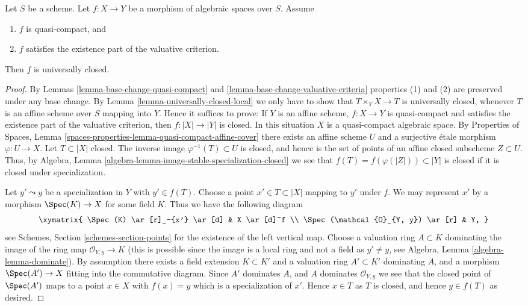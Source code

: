 \begin{lemma}
\label{lemma-quasi-compact-existence-universally-closed}
Let $S$ be a scheme.
Let $f : X \to Y$ be a morphism of algebraic spaces over $S$.
Assume
\begin{enumerate}
\item $f$ is quasi-compact, and
\item $f$ satisfies the existence part of the valuative criterion.
\end{enumerate}
Then $f$ is universally closed.
\end{lemma}

\begin{proof}
By Lemmas \ref{lemma-base-change-quasi-compact}
and \ref{lemma-base-change-valuative-criteria}
properties (1) and (2) are preserved under
any base change. By Lemma \ref{lemma-universally-closed-local}
we only have to show that $T \times_Y X \to T$ is universally closed,
whenever $T$ is an affine scheme over $S$ mapping into $Y$. Hence it
suffices to prove: If $Y$ is an affine scheme, $f : X \to Y$ is quasi-compact
and satisfies the existence part of the valuative criterion, then
$f : |X| \to |Y|$ is closed. In this situation $X$ is a quasi-compact
algebraic space. By
Properties of Spaces,
Lemma \ref{spaces-properties-lemma-quasi-compact-affine-cover}
there exists an affine scheme $U$ and a surjective \'etale morphism
$\varphi : U \to X$. Let $T \subset |X|$ closed. The inverse image
$\varphi^{-1}(T) \subset U$ is closed, and hence is the set of points
of an affine closed subscheme $Z \subset U$. Thus, by
Algebra, Lemma \ref{algebra-lemma-image-stable-specialization-closed}
we see that $f(T) = f(\varphi(|Z|)) \subset |Y|$ is closed if it is
closed under specialization.

\medskip\noindent
Let $y' \leadsto y$ be a specialization in $Y$ with $y' \in f(T)$.
Choose a point $x' \in T \subset |X|$ mapping to $y'$ under $f$.
We may represent $x'$ by a morphism $\Spec(K) \to X$
for some field $K$. Thus we have the following diagram
$$
\xymatrix{
\Spec(K) \ar[r]_-{x'} \ar[d] & X \ar[d]^f \\
\Spec(\mathcal{O}_{Y, y}) \ar[r] & Y,
}
$$
see
Schemes, Section \ref{schemes-section-points}
for the existence of the left vertical map.
Choose a valuation ring $A \subset K$ dominating the image of
the ring map $\mathcal{O}_{Y, y} \to K$ (this is possible since
the image is a local ring and not a field as $y' \not = y$, see
Algebra, Lemma \ref{algebra-lemma-dominate}).
By assumption there exists a field extension $K \subset K'$ and a
valuation ring $A' \subset K'$ dominating $A$, and a morphism
$\Spec(A') \to X$ fitting into the commutative diagram.
Since $A'$ dominates $A$, and $A$ dominates $\mathcal{O}_{Y, y}$
we see that the closed point of $\Spec(A')$ maps to
a point $x \in X$ with $f(x) = y$ which is a specialization of $x'$.
Hence $x \in T$ as $T$ is closed, and hence $y \in f(T)$ as desired.
\end{proof}

